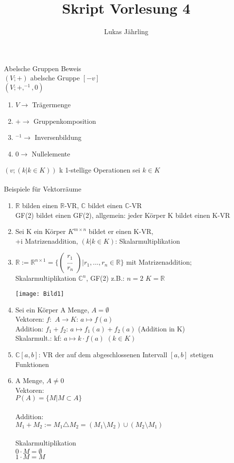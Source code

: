 \documentclass{scrartcl}
\title{Skript Vorlesung 4}
\author{Lukas Jährling}
\begin{document}
	\large
	Abelsche Gruppen
	\normalsize
	Beweis\\
	$(V;+)$ abelsche Gruppe $[-v]$\\
	$(V; +, ^{-1}, 0)$
	\begin{enumerate}
		\item $V \rightarrow$ Trägermenge
		\item $+ \rightarrow$ Gruppenkomposition
		\item $^{-1} \rightarrow$ Inversenbildung
		\item $0 \rightarrow$ Nullelemente 
	\end{enumerate}
	$(v; (k\vert k \in K))$ k 1-stellige Operationen sei $k \in K$
	\\
	\\
	Beispiele für Vektorräume
	\begin{enumerate}
		\item $\mathbb{R}$ bilden einen $\mathbb{R}$-VR, $\mathbb{C}$ bildet einen $\mathbb{C}$-VR\\  
			GF(2) bildet einen GF(2), allgemein: jeder Körper K bildet einen K-VR
		\item Sei K ein Körper $K^{m\times n}$ bildet er einen K-VR,\\ +i Matrizenaddition, $(k \vert k \in K)$: Skalarmultiplikation
		
		\item $\mathbb{R}:=\mathbb{R}^{n\times 1} = \{ \begin{pmatrix}
		r_1 \\ ... \\r_n
		\end{pmatrix}
		\vert
		r_1, ...,r_n \in \mathbb{R}
		\}$ mit Matrizenaddition; Skalarmultiplikation $\mathbb{C}^n$, GF(2) z.B.: $n=2$ $K = \mathbb{R}$
		
		\texttt{[image: Bild1]}
		
		\item Sei ein Körper A Menge, $A= \emptyset$ \\
		Vektoren: $f:$ $A \rightarrow K$: $a \mapsto f(a)$\\
		Addition: $f_1+f_2$: $a \mapsto f_1 (a)+f_2 (a)$ (Addition in K)\\
		Skalarmult.: kf: $a \mapsto k\cdot f(a)$ \hspace{1 cm} $(k \in K)$
		
		\item $\mathbb{C}[a,b]$: VR der auf dem abgeschlossenen Intervall $[a,b]$ stetigen Funktionen
		
		\item A Menge, $A\not = 0$\\
		Vektoren:\\ $P(A)=\{M \vert M \subset A\}$\\\\
		Addition:\\ $M_1 + M_2 := M_1 \triangle M_2 = (M_1 \setminus M_2)\cup (M_2\setminus M_1)$\\\\
		Skalarmultiplikation\\ $0 \cdot M = \emptyset$\\ $1 \cdot M = M$
		
	\end{enumerate}
	
\end{document}
